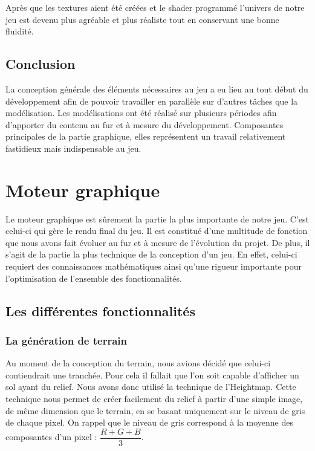 \documentclass[11pt]{report}
\begin{document}
Après que les textures aient été créées et le shader programmé l’univers de notre jeu est devenu plus agréable et plus réaliste tout en conservant une bonne fluidité. 

\section{Conclusion}

La conception générale des éléments nécessaires au jeu a eu lieu au tout début du développement afin de pouvoir travailler en parallèle sur d’autres tâches que la modélisation. Les modélisations ont été réalisé sur plusieurs périodes afin d’apporter du contenu au fur et à mesure du développement. Composantes principales de la partie graphique, elles représentent un travail relativement fastidieux mais indispensable au jeu. 

\chapter{Moteur graphique}

Le moteur graphique est sûrement la partie la plus importante de notre jeu. C'est celui-ci qui gère le rendu final du jeu. Il est constitué d'une multitude de fonction que nous avons fait évoluer au fur et à mesure de l'évolution du projet. De plus, il s'agit de la partie la plus technique de la conception d'un jeu. En effet, celui-ci requiert des connaissances mathématiques ainsi qu'une rigueur importante pour l'optimisation de l'ensemble des fonctionnalités.

\section{Les différentes fonctionnalités}

\subsection{La génération de terrain}

Au moment de la conception du terrain, nous avions décidé que celui-ci contiendrait une tranchée. Pour cela il fallait que l'on soit capable d'afficher un sol ayant du relief. Nous avons donc utilisé la technique de l'Heightmap. Cette technique nous permet de créer facilement du relief à partir d'une simple image, de même dimension que le terrain, en se basant uniquement sur le niveau de gris de chaque pixel. On rappel que le niveau de gris correspond à la moyenne des composantes d'un pixel : \( \dfrac{R + G + B}{3} \). 
\end{document}
